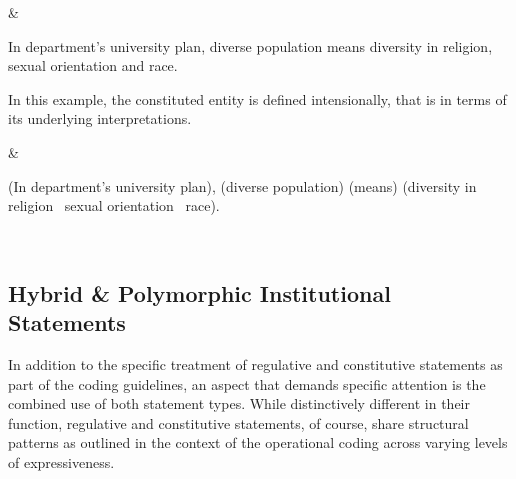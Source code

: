 \begin{landscape}
\begin{longtable}{\tabledims}
& 


\begin{exi}In department's university plan, diverse population means diversity in religion, sexual orientation and race.\end{exi}

\sp

In this example, the constituted entity is defined intensionally, that is in terms of its underlying interpretations.

& 

\vspace{0.03cm}

\begin{exi}
\Cacconst{}(In department's university plan), \E{}(diverse population) \F{}(means) \Pp{}(\lp diversity in religion \AND{}~sexual orientation \AND{}~race\rp).\end{exi}

\\

\toprule

\caption{Coding Guidance on Syntactic Elements for IG Logico as Level of Expressiveness (Constitutive Statements)}
\label{tab:CodingIgLogicoConstitutive}
\end{longtable}

\end{landscape}

\subsection{Hybrid \& Polymorphic Institutional Statements}
\label{subsec:ConstitutiveRegulativeHybrids}

In addition to the specific treatment of regulative and constitutive statements as part of the coding guidelines, an aspect that demands specific attention is the combined use of both statement types. While distinctively different in their function, regulative and constitutive statements, of course, share structural patterns as outlined in the context of the operational coding across varying levels of expressiveness.

\sp

